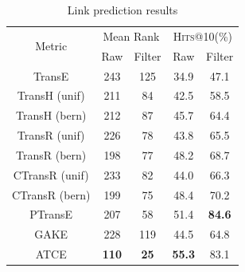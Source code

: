 \begin{table} %
  \caption{Link prediction results}
  \label{table_link_prediction_results}
  \begin{tabular}{c|cc|cc}
    \hline
    \multirow{2}{*}{Metric}  & \multicolumn{2}{c|}{Mean Rank} & \multicolumn{2}{c}{\textsc{Hits}@10(\%)} \\
                             & Raw          & Filter          & Raw           & Filter          \\
    \hline
    TransE                   & 243          & 125             & 34.9          & 47.1            \\
    TransH (unif)            & 211          & 84              & 42.5          & 58.5            \\
    TransH (bern)            & 212          & 87              & 45.7          & 64.4            \\
    TransR (unif)            & 226          & 78              & 43.8          & 65.5            \\
    TransR (bern)            & 198          & 77              & 48.2          & 68.7            \\
    CTransR (unif)           & 233          & 82              & 44.0          & 66.3            \\
    CTransR (bern)           & 199          & 75              & 48.4          & 70.2            \\
    PTransE                  & 207          & 58              & 51.4          & \textbf{84.6}   \\
    GAKE                     & 228          & 119             & 44.5          & 64.8            \\
    \hline
    ATCE                      & \textbf{110} & \textbf{25}     & \textbf{55.3} & 83.1            \\
    \hline
  \end{tabular}
\end{table}

